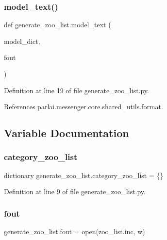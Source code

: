 \subsubsection{\texorpdfstring{model\+\_\+text()}{model\_text()}}
{\footnotesize\ttfamily def generate\+\_\+zoo\+\_\+list.\+model\+\_\+text (\begin{DoxyParamCaption}\item[{}]{model\+\_\+dict,  }\item[{}]{fout }\end{DoxyParamCaption})}



Definition at line 19 of file generate\+\_\+zoo\+\_\+list.\+py.



References parlai.\+messenger.\+core.\+shared\+\_\+utils.\+format.



\subsection{Variable Documentation}
\mbox{\label{namespacegenerate__zoo__list_a5fcda76c48a176fc2daa0d12a9602f49}} 
\subsubsection{\texorpdfstring{category\+\_\+zoo\+\_\+list}{category\_zoo\_list}}
{\footnotesize\ttfamily dictionary generate\+\_\+zoo\+\_\+list.\+category\+\_\+zoo\+\_\+list = \{\}}



Definition at line 9 of file generate\+\_\+zoo\+\_\+list.\+py.

\mbox{\label{namespacegenerate__zoo__list_a856ce3399906c5da79bdf26a784249ae}} 
\subsubsection{\texorpdfstring{fout}{fout}}
{\footnotesize\ttfamily generate\+\_\+zoo\+\_\+list.\+fout = open(\textquotesingle{}zoo\+\_\+list.\+inc\textquotesingle{}, \textquotesingle{}w\textquotesingle{})}



